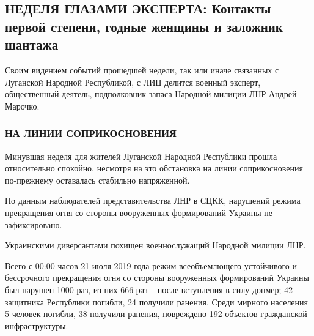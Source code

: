  
 
 
 
 

\subsection{НЕДЕЛЯ ГЛАЗАМИ ЭКСПЕРТА: Контакты первой степени, годные женщины и заложник шантажа}
\label{sec:02_01_2022.stz.news.lnr.lug_info.1.marochko_itogi}


\begin{zznagolos}
Своим видением событий прошедшей недели, так или иначе связанных с Луганской
Народной Республикой, с ЛИЦ делится военный эксперт, общественный деятель,
подполковник запаса Народной милиции ЛНР Андрей Марочко.
\end{zznagolos}


\subsubsection{НА ЛИНИИ СОПРИКОСНОВЕНИЯ}

Минувшая неделя для жителей Луганской Народной Республики прошла относительно
спокойно, несмотря на это обстановка на линии соприкосновения по-прежнему
оставалась стабильно напряженной.

По данным наблюдателей представительства ЛНР в СЦКК, нарушений режима
прекращения огня со стороны вооруженных формирований Украины не зафиксировано.

Украинскими диверсантами похищен военнослужащий Народной милиции ЛНР.

Всего с 00:00 часов 21 июля 2019 года режим всеобъемлющего устойчивого и
бессрочного прекращения огня со стороны вооруженных формирований Украины был
нарушен 1000 раз, из них 666 раз – после вступления в силу допмер; 42 защитника
Республики погибли, 24 получили ранения. Среди мирного населения 5 человек
погибли, 38 получили ранения, повреждено 192 объектов гражданской
инфраструктуры.

